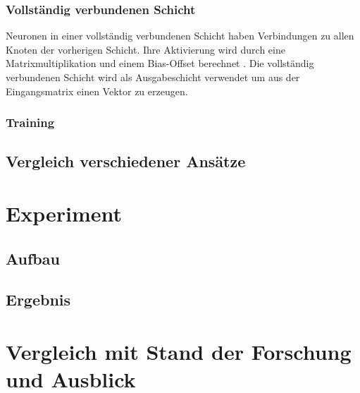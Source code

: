 \documentclass[twosided,a4,10pt]{article}
\begin{document}
\begin{multicols}{2}
\subsubsection*{Vollständig verbundenen Schicht}
Neuronen in einer vollständig verbundenen Schicht haben Verbindungen zu allen Knoten der vorherigen Schicht. Ihre Aktivierung wird durch eine Matrixmultiplikation und einem Bias-Offset berechnet \cite{karpathy}. Die vollständig verbundenen Schicht wird als Ausgabeschicht verwendet um aus der Eingangsmatrix einen Vektor zu erzeugen.

\subsubsection*{Training}

\subsection{Vergleich verschiedener Ansätze}

\section{Experiment}

\subsection{Aufbau}

\subsection{Ergebnis}

\section{Vergleich mit Stand der Forschung und Ausblick}

%



\end{multicols}
\end{document}
